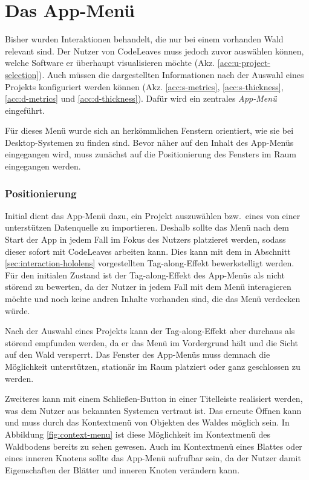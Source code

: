 \section{Das App-Menü}
\label{sec:app-menu}

Bisher wurden Interaktionen behandelt, die nur bei einem vorhanden Wald relevant sind. Der Nutzer von CodeLeaves muss jedoch zuvor auswählen können, welche Software er überhaupt visualisieren möchte (Akz. \ref{acc:u-project-selection}). Auch müssen die dargestellten Informationen nach der Auswahl eines Projekts konfiguriert werden können (Akz. \ref{acc:s-metrics}, \ref{acc:s-thickness}, \ref{acc:d-metrics} und \ref{acc:d-thickness}). Dafür wird ein zentrales \textit{App-Menü} eingeführt.

Für dieses Menü wurde sich an herkömmlichen Fenstern orientiert, wie sie bei Desktop-Systemen zu finden sind. Bevor näher auf den Inhalt des App-Menüs eingegangen wird, muss zunächst auf die Positionierung des Fensters im Raum eingegangen werden.

\subsubsection*{Positionierung}

Initial dient das App-Menü dazu, ein Projekt auszuwählen bzw.\ eines von einer unterstützen Datenquelle zu importieren. Deshalb sollte das Menü nach dem Start der App in jedem Fall im Fokus des Nutzers platzieret werden, sodass dieser sofort mit CodeLeaves arbeiten kann. Dies kann mit dem in Abschnitt \ref{sec:interaction-hololens} vorgestellten Tag-along-Effekt bewerkstelligt werden. Für den initialen Zustand ist der Tag-along-Effekt des App-Menüs als nicht störend zu bewerten, da der Nutzer in jedem Fall mit dem Menü interagieren möchte und noch keine andren Inhalte vorhanden sind, die das Menü verdecken würde.

Nach der Auswahl eines Projekts kann der Tag-along-Effekt aber durchaus als störend empfunden werden, da er das Menü im Vordergrund hält und die Sicht auf den Wald versperrt. Das Fenster des App-Menüs muss demnach die Möglichkeit unterstützen, stationär im Raum platziert oder ganz geschlossen zu werden.

Zweiteres kann mit einem Schließen-Button in einer Titelleiste realisiert werden, was dem Nutzer aus bekannten Systemen vertraut ist. Das erneute Öffnen kann und muss durch das Kontextmenü von Objekten des Waldes möglich sein. In Abbildung \ref{fig:context-menu} ist diese Möglichkeit im Kontextmenü des Waldbodens bereits zu sehen gewesen. Auch im Kontextmenü eines Blattes oder eines inneren Knotens sollte das App-Menü aufrufbar sein, da der Nutzer damit Eigenschaften der Blätter und inneren Knoten verändern kann.

